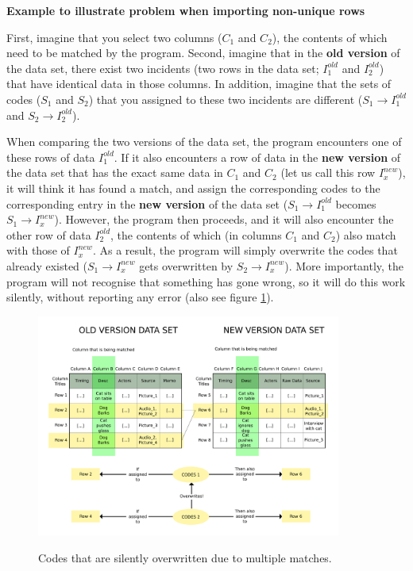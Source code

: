 \documentclass{memoir}
\begin{document}
\begin{framed}
  \textbf{Example to illustrate problem when importing non-unique rows}

  First, imagine that you select two columns (\(C_1\) and \(C_2\)), the contents of which need to be matched by the program. Second, imagine that in the \textbf{old version} of the data set, there exist two incidents (two rows in the data set; \(I^{old}_1\) and \(I^{old}_2\)) that have identical data in those columns. In addition, imagine that the sets of codes (\(S_1\) and \(S_2\)) that you assigned to these two incidents are different (\(S_1 \rightarrow I^{old}_1\) and \(S_2 \rightarrow I^{old}_2\)).

  When comparing the two versions of the data set, the program encounters one of these rows of data \(I^{old}_1\). If it also encounters a row of data in the \textbf{new version} of the data set that has the exact same data in \(C_1\) and \(C_2\) (let us call this row \(I^{new}_x\)), it will think it has found a match, and assign the corresponding codes to the corresponding entry in the \textbf{new version} of the data set (\(S_1 \rightarrow I^{old}_1\) becomes \(S_1 \rightarrow I^{new}_x\)). However, the program then proceeds, and it will also encounter the other row of data \(I^{old}_2\), the contents of which (in columns \(C_1\) and \(C_2\)) also match with those of \(I^{new}_x\). As a result, the program will simply overwrite the codes that already existed (\(S_1 \rightarrow I^{new}_x\) gets overwritten by \(S_2 \rightarrow I^{new}_x\)). More importantly, the program will not recognise that something has gone wrong, so it will do this work silently, without reporting any error (also see figure \ref{fig:overwritingcodes}).
\end{framed}

\begin{figure}[h!]
  \centering
  \caption{Codes that are silently overwritten due to multiple matches.}
  \includegraphics[width=100mm]{Diagram_2.pdf}
  \label{fig:overwritingcodes}
\end{figure}
\end{document}
